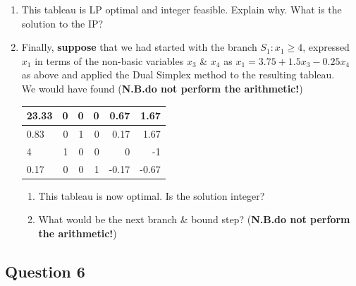 \documentclass[12pt]{article}
\begin{document}
\begin{itemize}
\begin{enumerate}[(i)]
\begin{enumerate}
				\item This tableau is LP optimal and integer feasible. Explain why. What is the solution to the IP?
				\item Finally, {\bf suppose} that we had started with the branch $S_1: x_1 \ge 4$, expressed  $x_1$ in terms of the non-basic variables $x_3$ \& $x_4$ as $x_1 =3.75+1.5 x_3 -0.25 x_4$ as above and applied the Dual Simplex method to the resulting tableau.\\
				\smallskip
				We would have found  ({\bf N.B.do not perform the arithmetic!})
				\begin{center}
				\begin{tabular}[h]{|l|rrrrr|}\hline
					23.33       &      0&             0&             0&          0.67&          1.67\\ \hline
					0.83&             0&          1&             0&          0.17&          1.67\\
					4 &         1 &            0 &            0 &            0 &        -1\\
					0.17  &           0  &           0  &        1  &       -0.17  &       -0.67\\\hline
				\end{tabular}
				\end{center}
				\begin{enumerate}
					\item 
					This tableau is now optimal. Is the solution integer?
					\item What would be the next branch \& bound step?  ({\bf N.B.do not perform the arithmetic!})
				\end{enumerate}
					\end{enumerate}
		\end{enumerate}
			
	\end{itemize}

				\subsection*{Question 6}
				
				
\end{document}
